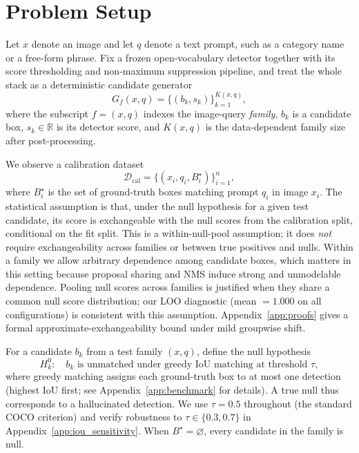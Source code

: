 \documentclass{article}
\theoremstyle{remark}
\newcommand{\1}{\mathbf{1}}
\begin{document}
\section{Problem Setup}
\label{sec:setup}

Let $x$ denote an image and let $q$ denote a text prompt, such as a category name or a free-form phrase. Fix a frozen open-vocabulary detector together with its score thresholding and non-maximum suppression pipeline, and treat the whole stack as a deterministic candidate generator
\begin{equation}
G_f(x, q) = \{(b_k, s_k)\}_{k=1}^{K(x,q)},
\end{equation}
where the subscript $f=(x,q)$ indexes the image-query \emph{family}, $b_k$ is a candidate box, $s_k \in \mathbb{R}$ is its detector score, and $K(x,q)$ is the data-dependent family size after post-processing.

We observe a calibration dataset
\begin{equation}
\mathcal{D}_{\mathrm{cal}} = \{(x_i, q_i, B_i^\star)\}_{i=1}^n,
\end{equation}
where $B_i^\star$ is the set of ground-truth boxes matching prompt $q_i$ in image $x_i$. The statistical assumption is that, under the null hypothesis for a given test candidate, its score is exchangeable with the null scores from the calibration split, conditional on the fit split. This is a within-null-pool assumption; it does \emph{not} require exchangeability across families or between true positives and nulls. Within a family we allow arbitrary dependence among candidate boxes, which matters in this setting because proposal sharing and NMS induce strong and unmodelable dependence. Pooling null scores across families is justified when they share a common null score distribution; our LOO diagnostic (mean $=1.000$ on all configurations) is consistent with this assumption. Appendix~\ref{app:proofs} gives a formal approximate-exchangeability bound under mild groupwise shift.

For a candidate $b_k$ from a test family $(x,q)$, define the null hypothesis
\begin{equation}
H_k^0:\quad b_k \text{ is unmatched under greedy IoU matching at threshold } \tau,
\end{equation}
where greedy matching assigns each ground-truth box to at most one detection
(highest IoU first; see Appendix~\ref{app:benchmark} for details).
A true null thus corresponds to a hallucinated detection. We use $\tau=0.5$ throughout (the standard COCO criterion) and verify robustness to $\tau\in\{0.3,0.7\}$ in Appendix~\ref{app:iou_sensitivity}. When $B^\star=\varnothing$, every candidate in the family is null.
\end{document}
